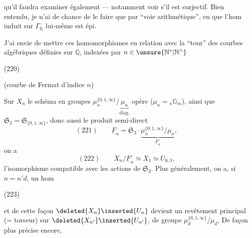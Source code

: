 qu'il faudra examiner également --- notamment voir s'il est surjectif.
Bien entendu, je n'ai de chance de le faire que par ``voie arithmétique'', en  que l'hom induit sur $\Gamma_{\mathbb Q}$ lui-même est épi.



J'ai envie de mettre ces homomorphismes en relation avec la ``tour'' des courbes algébriques définies sur $\mathbb Q$, indexées par $n\in\unsure{\mathbb N^{*}|\mathbb N^{\wedge}}$

\begin{samepage}
\noindent (220)\quad
{}
\end{samepage}
\hfill (courbe de Fermat d'indice $n$)


Sur $X_n$ le schéma en groupes $\mu_n^{\{0,1,\infty\}}/\underbrace{\mu_n}_{\mathrm{diag}.}$ opère ($\mu_n={}_n\mathbb G_m$),  ainsi que $\mathfrak S_3=\mathfrak S_{\{0,1,\infty\}}$, donc aussi le produit semi-direct
\[
(221)\qquad \underline F_n=\mathfrak S_3\mathbin{\cdot}\underbrace{\mu_n^{\{0,1,\infty\}}/\mu_n}_{\underline F_n^{\circ}},
\]
on a
\[
(222)\qquad X_n/\underline F_n^{\circ}\simeq X_1\simeq U_{0,3},
\]
l'isomorphisme compatible avec les actions de $\mathfrak S_3$. Plus généralement, on a, si $n=n'd$, un hom

\begin{samepage}
\noindent (223)\quad
{}
\end{samepage}

et de cette façon $\deleted{X_n}\inserted{U_n}$ devient un revêtement principal (= torseur) sur $\deleted{X_{n'}}\inserted{U_{n'}}$, de groupe $\mu_d^{\{0,1,\infty\}}/\mu_d$, De façon plus précise encore, 

